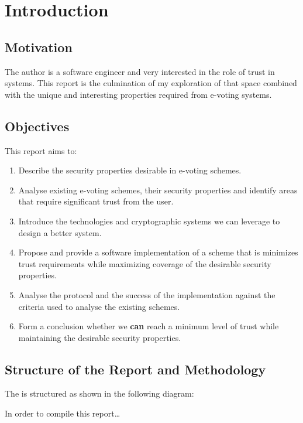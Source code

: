 \chapter{Introduction}
\label{ch:intro}

\section{Motivation}
\label{ch:intro:motiv}

The author is a software engineer and very interested in the role of trust in systems. This report is the culmination of my exploration of that space combined with the unique and interesting properties required from e-voting systems.


\section{Objectives}
\label{ch:intro:object}

This report aims to:

\begin{enumerate}
    \item Describe the security properties desirable in e-voting schemes.
    \item Analyse existing e-voting schemes, their security properties and identify areas that require significant trust from the user.
    \item Introduce the technologies and cryptographic systems we can leverage to design a better system.
    \item Propose and provide a software implementation of a scheme that is minimizes trust requirements while maximizing coverage of the desirable security properties.
    \item Analyse the protocol and the success of the implementation against the criteria used to analyse the existing schemes.
    \item Form a conclusion whether we {\textbf{can}} reach a minimum level of trust while maintaining the desirable security properties.
\end{enumerate}


\section{Structure of the Report and Methodology}
\label{ch:intro:method}

The is structured as shown in the following diagram:


In order to compile this report\dots




